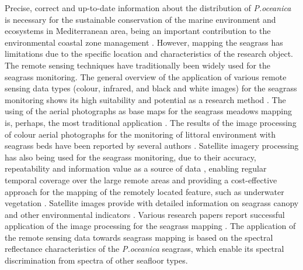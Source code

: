 \documentclass[11pt]{article}
\begin{document}
Precise, correct and up-to-date information about the distribution of \textit{P.oceanica} is necessary for the
sustainable conservation of the marine environment and ecosystems in Mediterranean area, being an
important contribution to the environmental coastal zone management \cite{Pergent-Martini06}\label{Pergent-Martini06}.
However, mapping the seagrass has limitations due to the specific location and characteristics of the
research object. The remote sensing techniques have traditionally been widely used for the seagrass
monitoring. 
The general overview of the application of various remote sensing data types (colour,
infrared, and black and white images) for the seagrass monitoring shows its high suitability and
potential as a research method \cite{Pasqualini01,Matarrese06}\label{Pasqualini01}\label{Matarrese06}. The using of the aerial
photographs as base maps for the seagrass meadows mapping is, perhaps, the most traditional
application \cite{McKenzie03,Kendrick00,Pasqualini99}\label{McKenzie03} \label{Kendrick00} \label{Pasqualini99}. The results of the image
processing of colour aerial photographs for the monitoring of littoral environment with seagrass beds
have been reported by several authors \cite{Kelly80,Walker89,Green96}\label{Kelly80} \label{Walker89} \label{Green96}.
Satellite imagery processing has also being used for the seagrass monitoring, due to their accuracy,
repeatability and information value as a source of data \cite{Dekker05b}\label{Dekker05b}, enabling regular temporal
coverage over the large remote areas and providing a cost-effective approach for the mapping of the
remotely located feature, such as underwater vegetation \cite{Jensen95}\label{Jensen95}. Satellite images provide
with detailed information on seagrass canopy and other environmental indicators \cite{Fyfe03}\label{Fyfe03}.
Various research papers report successful application of the image processing for the
seagrass mapping \cite{Calvo03,Dekker05a,Fornes06,Green96,Jackson07,Jensen95,Kendrick00,Lyzenga81,Malthus03,Matarrese08,Mount03,Pasqualini01,Pasqualini99,Pasqualini98a,Pergent-Martini06,Ralph05,Ribed02,Short01,Walker89}\label{Calvo03}\label{Dekker05a}\label{Fornes06}\label{Green96}\label{Jackson07}\label{Jensen95}\label{Kendrick00} \label{Lyzenga81}\label{Malthus03}\label{Matarrese08}\label{Mount03}\label{Pasqualini01}\label{Pasqualini99}\label{Pasqualini98a}\label{Pergent-Martini06}\label{Ralph05}\label{Ribed02}\label{Short01}\label{Walker89}. The application of the remote sensing data towards seagrass mapping is based on the spectral reflectance
 characteristics of the \textit{P.oceanica} seagrass, which enable its spectral discrimination from spectra of other seafloor types. 
\end{document}
